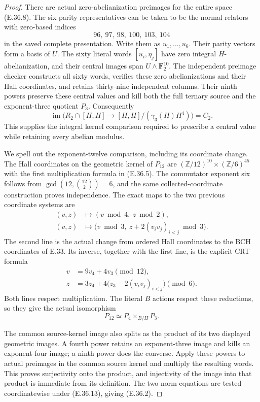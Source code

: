 \begin{proof}
There are actual zero-abelianization preimages
for the entire space \textup{(E.36.8)}.
The six parity representatives can be taken
to be the normal relators with zero-based
indices
\[
                    96,\ 97,\ 98,\ 100,\ 103,\ 104
 \tag{E.36.9}
\]
in the saved complete presentation.
Write them as $u_1,\ldots,u_6$.
Their parity vectors form a basis of $U$.
The sixty literal words
$[u_i,\eta_j]$ have zero integral
$H$-abelianization, and their central images
span $U\wedge\mathbf F_2^{10}$.
The independent preimage checker constructs
all sixty words, verifies these zero
abelianizations and their Hall coordinates,
and retains thirty-nine independent columns.
Their ninth powers preserve these central
values and kill both the full ternary source
and the exponent-three quotient $P_3$.
Consequently
\[
 \operatorname{im}\bigl(
 R_2\cap[H,H]\longrightarrow
 [H,H]/(\gamma_3(H)H^4)\bigr)=C_2 .
 \tag{E.36.10}
\]
This supplies the integral kernel comparison
required to prescribe a central value while
retaining every abelian modulus.

We spell out the exponent-twelve comparison,
including its coordinate change.  The Hall
coordinates on the geometric kernel of
$P_{12}$ are
$(\mathbb Z/12)^{10}\times(\mathbb Z/6)^{45}$
with the first multiplication formula in
\textup{(E.36.5)}.  The commutator exponent
six follows from
$\gcd(12,\binom{12}{2})=6$, and the same
collected-coordinate construction proves
independence.  The exact maps to the two
previous coordinate systems are
\[
 \begin{split}
 (v,z)&\longmapsto(v\bmod4,\ z\bmod2),\\
 (v,z)&\longmapsto
       \bigl(v\bmod3,\ z+2(v_iv_j)_{i<j}\bmod3\bigr).
 \end{split}
 \tag{E.36.11}
\]
The second line is the actual change from
ordered Hall coordinates to the BCH coordinates
of E.33.  Its inverse, together with the first
line, is the explicit CRT formula
\[
 \begin{split}
 v&=9v_4+4v_3\pmod{12},\\
 z&=3z_4+4\bigl(z_3-2(v_iv_j)_{i<j}\bigr)\pmod6 .
 \end{split}
 \tag{E.36.12}
\]
Both lines respect multiplication.
The literal $B$ actions respect these reductions,
so they give the actual isomorphism
\[
                   P_{12}\simeq P_4\times_{B/H}P_3 .
 \tag{E.36.13}
\]

The common source-kernel image also splits as
the product of its two displayed geometric
images.  A fourth power retains an
exponent-three image and kills an exponent-four
image; a ninth power does the converse.
Apply these powers to actual preimages in the
common source kernel and multiply the resulting
words.  This proves surjectivity onto the
product, and injectivity of the image into
that product is immediate from its definition.
The two norm equations are tested coordinatewise
under \textup{(E.36.13)}, giving
\textup{(E.36.2)}.


\end{proof}
